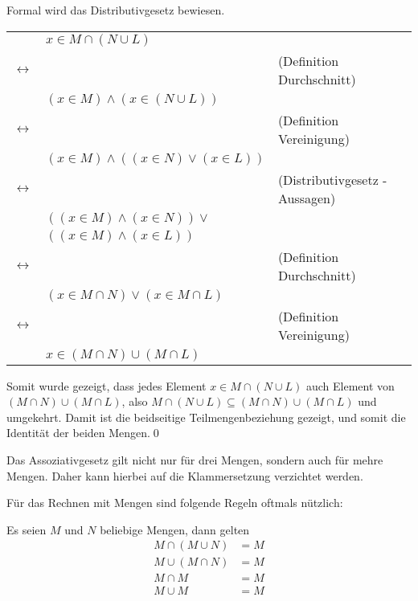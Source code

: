 \begin{Unit}[Satz]
Formal wird das Distributivgesetz bewiesen.

\begin{tabular}{l l | l}
    & $x \in M \cap (N \cup L)$ & \\
$\leftrightarrow$ & & (Definition Durchschnitt) \\
    & $(x\in M) \land (x \in (N \cup L))$ &  \\
$\leftrightarrow$ & & (Definition Vereinigung) \\
    & $(x\in M) \land ((x \in N) \lor (x\in L))$ & \\
$\leftrightarrow$ & & (Distributivgesetz - Aussagen) \\
    & $((x\in M) \land (x \in N)) \lor $ & \\
                  & $((x \in M) \land (x \in L))$ & \\
$\leftrightarrow$ & & (Definition Durchschnitt) \\
    & $(x \in M \cap N) \lor (x \in M \cap L)$ & \\
$\leftrightarrow$ & & (Definition Vereinigung) \\
    & $x \in (M \cap N) \cup (M \cap L)$ & \\
\end{tabular}

Somit wurde gezeigt, dass jedes Element $x \in M \cap (N \cup L)$ auch Element
von $(M \cap N) \cup (M \cap L)$, also $M \cap (N \cup L) \subseteq (M \cap N) 
\cup (M \cap L)$ und umgekehrt. Damit ist die beidseitige 
Teilmengenbeziehung gezeigt, und somit die Identität der beiden Mengen.\qed

Das Assoziativgesetz gilt nicht nur für drei Mengen, sondern auch für mehre 
Mengen. Daher kann hierbei auf die Klammersetzung verzichtet werden.
\end{Unit}

\begin{Unit}[Bemerkung]
Für das Rechnen mit Mengen sind folgende Regeln oftmals nützlich:
\begin{Bemerkung}
  Es seien $M$ und $N$ beliebige Mengen, dann gelten
  \begin{align}
    M \cap (M \cup N) &= M \\
    M \cup (M \cap N) &= M \\
    M \cap M &= M \\
    M \cup M &= M
  \end{align}
\end{Bemerkung}
\end{Unit}

